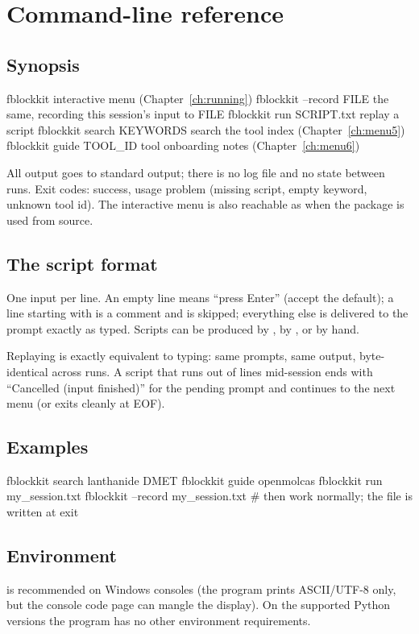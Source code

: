 \chapter{Command-line reference}
\label{ch:cli}

\section{Synopsis}

\begin{codeblock}
fblockkit                      interactive menu (Chapter~\ref{ch:running})
fblockkit --record FILE        the same, recording this session's input to FILE
fblockkit run SCRIPT.txt       replay a script
fblockkit search KEYWORDS      search the tool index (Chapter~\ref{ch:menu5})
fblockkit guide TOOL_ID        tool onboarding notes (Chapter~\ref{ch:menu6})
\end{codeblock}

All output goes to standard output; there is no log file and no state between
runs. Exit codes:  success,  usage problem (missing script,
empty keyword, unknown tool id). The interactive menu is also reachable as
 when the package is used from source.

\section{The script format}

One input per line. An empty line means ``press Enter'' (accept the default);
a line starting with \code{\#} is a comment and is skipped; everything else is
delivered to the prompt exactly as typed. Scripts can be produced by
, by , or by hand.

Replaying is exactly equivalent to typing: same prompts, same output,
byte-identical across runs. A script that runs out of lines mid-session ends
with ``Cancelled (input finished)'' for the pending prompt and continues to the
next menu (or exits cleanly at EOF).

\section{Examples}

\begin{codeblock}
fblockkit search lanthanide DMET
fblockkit guide openmolcas
fblockkit run my_session.txt
fblockkit --record my_session.txt      # then work normally; the file is written at exit
\end{codeblock}

\section{Environment}

 is recommended on Windows consoles (the program prints
ASCII/UTF-8 only, but the console code page can mangle the display). On the
supported Python versions the program has no other environment requirements.
